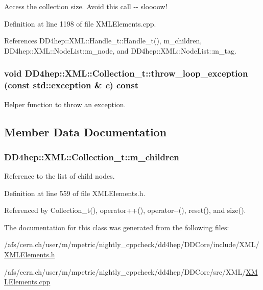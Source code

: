 Access the collection size. Avoid this call -\/-\/ sloooow! 

Definition at line 1198 of file XMLElements.cpp.

References DD4hep::XML::Handle\_\-t::Handle\_\-t(), m\_\-children, DD4hep::XML::NodeList::m\_\-node, and DD4hep::XML::NodeList::m\_\-tag.\hypertarget{class_d_d4hep_1_1_x_m_l_1_1_collection__t_a6a4f5e072d0dc1dbdd5d2ae2c863be60}{
\subsubsection[{throw\_\-loop\_\-exception}]{\setlength{\rightskip}{0pt plus 5cm}void DD4hep::XML::Collection\_\-t::throw\_\-loop\_\-exception (const std::exception \& {\em e}) const}}
\label{class_d_d4hep_1_1_x_m_l_1_1_collection__t_a6a4f5e072d0dc1dbdd5d2ae2c863be60}


Helper function to throw an exception. 

\subsection{Member Data Documentation}
\hypertarget{class_d_d4hep_1_1_x_m_l_1_1_collection__t_a258610612b270dbcadb7ddec5206387d}{
\subsubsection[{m\_\-children}]{ {\bf DD4hep::XML::Collection\_\-t::m\_\-children}}}
\label{class_d_d4hep_1_1_x_m_l_1_1_collection__t_a258610612b270dbcadb7ddec5206387d}


Reference to the list of child nodes. 

Definition at line 559 of file XMLElements.h.

Referenced by Collection\_\-t(), operator++(), operator-\/-\/(), reset(), and size().

The documentation for this class was generated from the following files:\begin{DoxyCompactItemize}
\item 
/afs/cern.ch/user/m/mpetric/nightly\_\-cppcheck/dd4hep/DDCore/include/XML/\hyperlink{_x_m_l_elements_8h}{XMLElements.h}\item 
/afs/cern.ch/user/m/mpetric/nightly\_\-cppcheck/dd4hep/DDCore/src/XML/\hyperlink{_x_m_l_elements_8cpp}{XMLElements.cpp}\end{DoxyCompactItemize}
